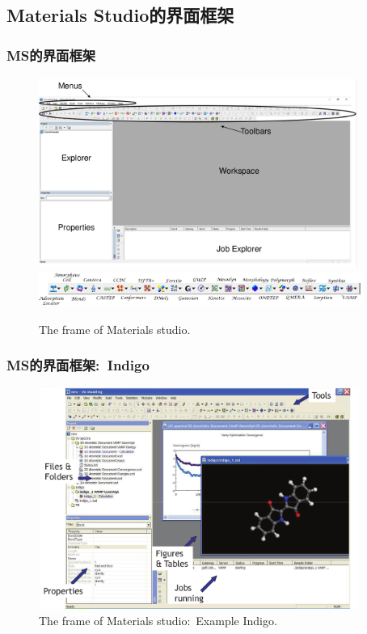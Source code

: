 \subsection{\rm{Materials Studio}的界面框架}
\frame
{
	\frametitle{\textrm{MS}的界面框架}
\begin{figure}[h!]
\centering
\vspace*{-0.31in}
\includegraphics[height=2.45in,width=4.10in,viewport=0 0 1340 800,clip]{Figures/MS-Frame.png}
\includegraphics[height=0.45in,width=4.15in,viewport=0 0 1400 147,clip]{Figures/MS-Frame_calculators.png}
\caption{\tiny \textrm{The frame of Materials studio.}}%
\label{MS-Frame}
\end{figure}
}

\frame
{
	\frametitle{\textrm{MS}的界面框架:~\textrm{Indigo}}
\begin{figure}[h!]
\centering
\vspace*{-0.28in}
\includegraphics[height=2.85in,width=4.15in,viewport=0 0 1140 800,clip]{Figures/MS-Frame_example.png}
\caption{\tiny \textrm{The frame of Materials studio:~Example Indigo.}}%
\label{MS-Frame_example}
\end{figure}
}

